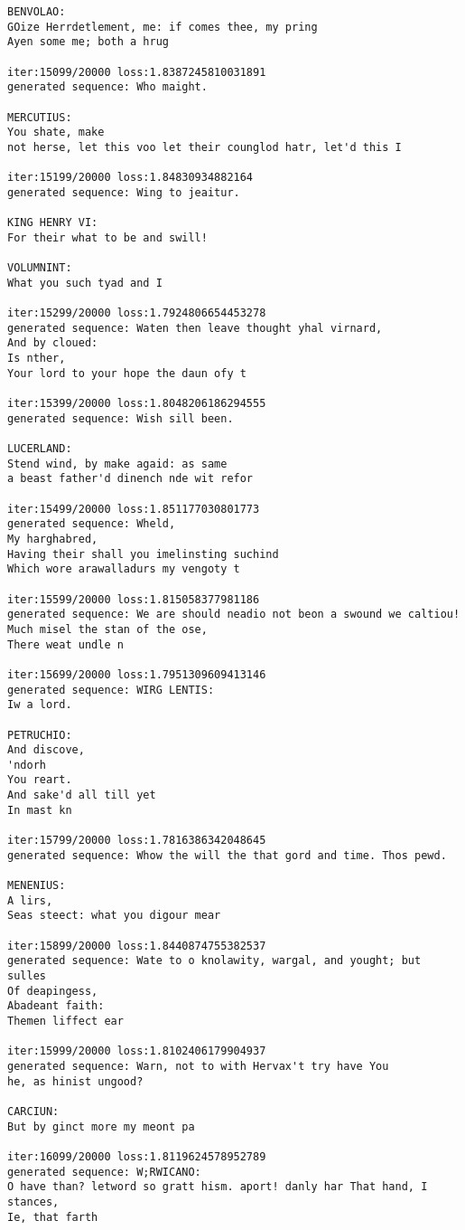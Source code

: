 \documentclass[11pt]{article}
\begin{document}
\begin{Verbatim}[commandchars=\\\{\}]
BENVOLAO:
GOize Herrdetlement, me: if comes thee, my pring
Ayen some me; both a hrug

iter:15099/20000 loss:1.8387245810031891
generated sequence: Who maight.

MERCUTIUS:
You shate, make
not herse, let this voo let their counglod hatr, let'd this I

iter:15199/20000 loss:1.84830934882164
generated sequence: Wing to jeaitur.

KING HENRY VI:
For their what to be and swill!

VOLUMNINT:
What you such tyad and I

iter:15299/20000 loss:1.7924806654453278
generated sequence: Waten then leave thought yhal virnard,
And by cloued:
Is nther,
Your lord to your hope the daun ofy t

iter:15399/20000 loss:1.8048206186294555
generated sequence: Wish sill been.

LUCERLAND:
Stend wind, by make agaid: as same
a beast father'd dinench nde wit refor

iter:15499/20000 loss:1.851177030801773
generated sequence: Wheld,
My harghabred,
Having their shall you imelinsting suchind
Which wore arawalladurs my vengoty t

iter:15599/20000 loss:1.815058377981186
generated sequence: We are should neadio not beon a swound we caltiou!
Much misel the stan of the ose,
There weat undle n

iter:15699/20000 loss:1.7951309609413146
generated sequence: WIRG LENTIS:
Iw a lord.

PETRUCHIO:
And discove,
'ndorh
You reart.
And sake'd all till yet
In mast kn

iter:15799/20000 loss:1.7816386342048645
generated sequence: Whow the will the that gord and time. Thos pewd.

MENENIUS:
A lirs,
Seas steect: what you digour mear

iter:15899/20000 loss:1.8440874755382537
generated sequence: Wate to o knolawity, wargal, and yought; but sulles
Of deapingess,
Abadeant faith:
Themen liffect ear

iter:15999/20000 loss:1.8102406179904937
generated sequence: Warn, not to with Hervax't try have You
he, as hinist ungood?

CARCIUN:
But by ginct more my meont pa

iter:16099/20000 loss:1.8119624578952789
generated sequence: W;RWICANO:
O have than? letword so gratt hism. aport! danly har That hand, I stances,
Ie, that farth 


\end{Verbatim}
\end{document}
